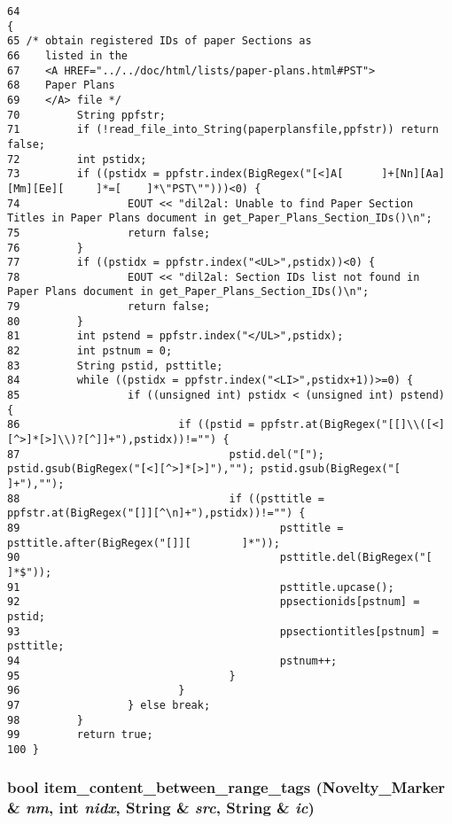 \footnotesize\begin{verbatim}64                                                                                           {
65 /* obtain registered IDs of paper Sections as
66    listed in the
67    <A HREF="../../doc/html/lists/paper-plans.html#PST">
68    Paper Plans
69    </A> file */
70         String ppfstr;
71         if (!read_file_into_String(paperplansfile,ppfstr)) return false;
72         int pstidx;
73         if ((pstidx = ppfstr.index(BigRegex("[<]A[      ]+[Nn][Aa][Mm][Ee][     ]*=[    ]*\"PST\"")))<0) {
74                 EOUT << "dil2al: Unable to find Paper Section Titles in Paper Plans document in get_Paper_Plans_Section_IDs()\n";
75                 return false;
76         }
77         if ((pstidx = ppfstr.index("<UL>",pstidx))<0) {
78                 EOUT << "dil2al: Section IDs list not found in Paper Plans document in get_Paper_Plans_Section_IDs()\n";
79                 return false;
80         }
81         int pstend = ppfstr.index("</UL>",pstidx);
82         int pstnum = 0;
83         String pstid, psttitle;
84         while ((pstidx = ppfstr.index("<LI>",pstidx+1))>=0) {
85                 if ((unsigned int) pstidx < (unsigned int) pstend) {
86                         if ((pstid = ppfstr.at(BigRegex("[[]\\([<][^>]*[>]\\)?[^]]+"),pstidx))!="") {
87                                 pstid.del("["); pstid.gsub(BigRegex("[<][^>]*[>]"),""); pstid.gsub(BigRegex("[  ]+"),"");
88                                 if ((psttitle = ppfstr.at(BigRegex("[]][^\n]+"),pstidx))!="") {
89                                         psttitle = psttitle.after(BigRegex("[]][        ]*"));
90                                         psttitle.del(BigRegex("[        ]*$"));
91                                         psttitle.upcase();
92                                         ppsectionids[pstnum] = pstid;
93                                         ppsectiontitles[pstnum] = psttitle;
94                                         pstnum++;
95                                 }
96                         }
97                 } else break;
98         }
99         return true;
100 }
\end{verbatim}\normalsize 
{}
\subsubsection{\setlength{\rightskip}{0pt plus 5cm}bool item\_\-content\_\-between\_\-range\_\-tags ({\bf Novelty\_\-Marker} \& {\em nm}, int {\em nidx}, {\bf String} \& {\em src}, {\bf String} \& {\em ic})}\label{ppfilter_8pre-blank_8cc_a7}




